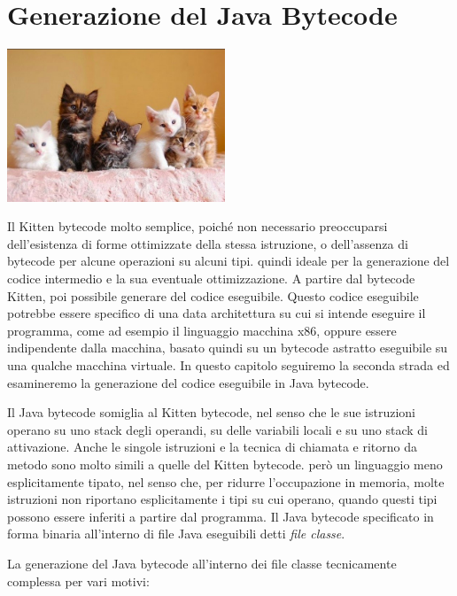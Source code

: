 \chapter{Generazione del Java Bytecode}\label{chap:java-bytecode}
%
\vspace*{-2ex}
\begin{center}
\includegraphics[width=6.5cm]{cat9.jpg}
\end{center}

Il Kitten bytecode \e molto semplice, poich\'e non \e necessario
preoccuparsi dell'esistenza di forme ottimizzate della stessa istruzione,
o dell'assenza di bytecode per alcune operazioni su alcuni tipi.
\E quindi ideale per la generazione del codice intermedio e la
sua eventuale ottimizzazione. A partire dal bytecode Kitten, \e poi possibile
generare del codice eseguibile. Questo codice eseguibile
potrebbe essere specifico di una data architettura su cui si intende
eseguire il programma, come ad esempio il linguaggio macchina
x86, oppure essere indipendente dalla macchina, basato quindi su
un bytecode astratto eseguibile su una qualche macchina virtuale.
In questo capitolo seguiremo la seconda strada ed esamineremo
la generazione del codice eseguibile in Java bytecode.

Il Java bytecode somiglia al Kitten bytecode, nel senso che le sue
istruzioni operano su uno stack degli operandi, su delle variabili
locali e su uno stack di attivazione. Anche le singole istruzioni e
la tecnica di chiamata e ritorno da metodo sono molto simili a quelle
del Kitten bytecode. \E per\`o un linguaggio meno esplicitamente
tipato, nel senso che, per ridurre l'occupazione in memoria,
molte istruzioni non riportano esplicitamente i
tipi su cui operano, quando questi tipi possono essere inferiti a partire
dal programma.
Il Java bytecode \e specificato in forma binaria all'interno di file
Java eseguibili detti \emph{file classe}.

La generazione del Java bytecode all'interno dei file classe \e tecnicamente
complessa per vari motivi:


